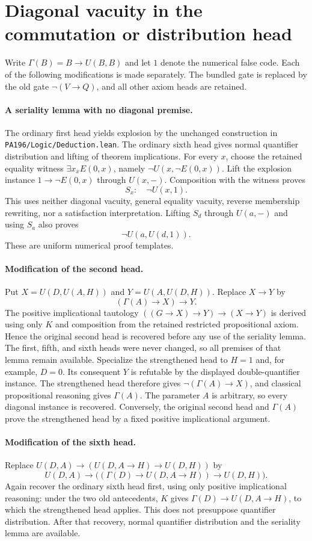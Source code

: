 \section{Diagonal vacuity in the commutation or distribution head}
Write $\Gamma(B)=B\to U(B,B)$ and let $1$ denote the numerical false
code. Each of the following modifications is made separately. The bundled
gate is replaced by the old gate $\neg(V\to Q)$, and all other axiom heads
are retained.

\paragraph{A seriality lemma with no diagonal premise.}
The ordinary first head yields explosion by the unchanged construction in
\texttt{PA196/Logic/Deduction.lean}. The ordinary sixth head gives normal
quantifier distribution and lifting of theorem implications. For every $x$,
choose the retained equality witness $\exists x_x E(0,x)$, namely
$\neg U(x,\neg E(0,x))$. Lift the explosion instance
$1\to\neg E(0,x)$ through $U(x,-)$. Composition with the witness proves
\[
 S_x:\quad\neg U(x,1).
\]
This uses neither diagonal vacuity, general equality vacuity, reverse
membership rewriting, nor a satisfaction interpretation. Lifting $S_d$
through $U(a,-)$ and using $S_a$ also proves
\[
 \neg U(a,U(d,1)).
\]
These are uniform numerical proof templates.

\paragraph{Modification of the second head.}
Put $X=U(D,U(A,H))$ and $Y=U(A,U(D,H))$. Replace $X\to Y$ by
\[
 (\Gamma(A)\to X)\to Y.
\]
The positive implicational tautology
$((G\to X)\to Y)\to(X\to Y)$ is derived using only $K$ and composition
from the retained restricted propositional axiom. Hence the original second
head is recovered before any use of the seriality lemma. The first, fifth,
and sixth heads were never changed, so all premises of that lemma remain
available. Specialize the strengthened head to $H=1$ and, for example,
$D=0$. Its consequent $Y$ is refutable by the displayed double-quantifier
instance. The strengthened head therefore gives
$\neg(\Gamma(A)\to X)$, and classical propositional reasoning gives
$\Gamma(A)$. The parameter $A$ is arbitrary, so every diagonal instance
is recovered. Conversely, the original second head and $\Gamma(A)$ prove
the strengthened head by a fixed positive implicational argument.

\paragraph{Modification of the sixth head.}
Replace
$U(D,A)\to(U(D,A\to H)\to U(D,H))$ by
\[
 U(D,A)\to
 \bigl((\Gamma(D)\to U(D,A\to H))\to U(D,H)\bigr).
\]
Again recover the ordinary sixth head first, using only positive
implicational reasoning: under the two old antecedents, $K$ gives
$\Gamma(D)\to U(D,A\to H)$, to which the strengthened head applies.
This does not presuppose quantifier distribution. After that recovery,
normal quantifier distribution and the seriality lemma are available.

